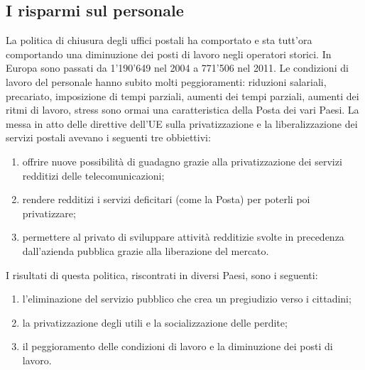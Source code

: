 \subsection{I risparmi sul personale}
La politica di chiusura degli uffici postali ha comportato e sta tutt’ora comportando una diminuzione dei posti di lavoro negli operatori storici. In Europa sono passati da 1'190'649 nel 2004 a 771'506 nel 2011. Le condizioni di lavoro del personale hanno subito molti peggioramenti: riduzioni salariali, precariato, imposizione di tempi parziali, aumenti dei tempi parziali, aumenti dei ritmi di lavoro, stress sono ormai una caratteristica della Posta dei vari Paesi.
La messa in atto delle direttive dell’UE sulla privatizzazione e la liberalizzazione dei servizi postali avevano i seguenti tre obbiettivi:
\begin{enumerate}
    \item offrire nuove possibilità di guadagno grazie alla privatizzazione dei servizi redditizi delle telecomunicazioni;
    \item rendere redditizi i servizi deficitari (come la Posta) per poterli poi privatizzare;
    \item permettere al privato di sviluppare attività redditizie svolte in precedenza dall’azienda pubblica grazie alla liberazione del mercato.
\end{enumerate}
I risultati di questa politica, riscontrati in diversi Paesi, sono i seguenti:
\begin{enumerate}
    \item l’eliminazione del servizio pubblico che crea un pregiudizio verso i cittadini;
    \item la privatizzazione degli utili e la socializzazione delle perdite;
    \item il peggioramento delle condizioni di lavoro e la diminuzione dei posti di lavoro.
\end{enumerate}
    
